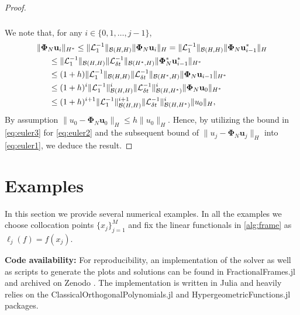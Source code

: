 \documentclass[10pt,a4paper]{article}
\numberwithin{equation}{section}
\begin{document}
\begin{proof}
\begin{align}
\begin{split}
\end{split}
\end{align}
We note that, for any $i \in \{0, 1, \dots, j-1\}$,
\begin{align}
\label{eq:euler3}
\begin{split}
& \|  {\bm \Phi}_N {\mathbf u}_{i} \|_{H^*} \leq   \| \mathcal{L}^{-1}_1\|_{\mathcal{B}(H,H)} \|  {\bm \Phi}_N {\mathbf u}_{i} \|_{H} 
=  \| \mathcal{L}^{-1}_1\|_{\mathcal{B}(H,H)} \|  {\bm \Phi}_N {\mathbf u}^*_{i-1} \|_{H} \\
&\indent  \leq  \| \mathcal{L}^{-1}_1\|_{\mathcal{B}(H,H)}  \| \mathcal{L}^{-1}_{\delta t}\|_{\mathcal{B}(H^*,H)}  \|  {\bm \Phi}^*_N {\mathbf u}^*_{i-1} \|_{H^*} \\
& \indent  \leq (1+h)  \| \mathcal{L}^{-1}_1\|_{\mathcal{B}(H,H)}  \| \mathcal{L}^{-1}_{\delta t}\|_{\mathcal{B}(H^*,H)}  \|  {\bm \Phi}_N {\mathbf u}_{i-1} \|_{H^*}\\
& \indent  \leq  (1+h)^i  \| \mathcal{L}^{-1}_1\|_{\mathcal{B}(H,H)}^i  \| \mathcal{L}^{-1}_{\delta t}\|^i_{\mathcal{B}(H,H^*)}  \|  {\bm \Phi}_N {\mathbf u}_{0} \|_{H^*} \\
& \indent  \leq    (1+h)^{i+1}  \| \mathcal{L}^{-1}_1\|_{\mathcal{B}(H,H)}^{i+1}  \| \mathcal{L}^{-1}_{\delta t}\|^i_{\mathcal{B}(H,H^*)} \| u_0 \|_{H},
\end{split}
\end{align}
By assumption $ \| u_{0} - {\bm \Phi}_N {\mathbf u}_{0} \|_H \leq h \| u_0 \|_H$. Hence, by utilizing the bound in \cref{eq:euler3} for \cref{eq:euler2} and the subsequent bound of $\| u_j  - {\bm \Phi}_N {\mathbf u}_j \|_H$ into \cref{eq:euler1}, we deduce the result. 
\end{proof}


\section{Examples}
\label{sec:examples}
In this section we provide several numerical examples. In all the examples we choose collocation points $\{x_j\}_{j=1}^M$ and fix the linear functionals in \cref{alg:frame} as $\ell_j(f) = f(x_j)$. 

\textbf{Code availability:} For reproducibility, an implementation of the solver as well as scripts to generate the plots and solutions can be found in FractionalFrames.jl \cite{fractionalframes.jl} and archived on Zenodo \cite{fractionalframes-zenodo-v5}. The implementation is written in Julia \cite{Bezanson2017} and heavily relies on the ClassicalOrthogonalPolynomials.jl \cite{ClassicPoly.jl2023} and HypergeometricFunctions.jl \cite{Hyper.jl2023,slevinsky2025} packages.
\end{document}
